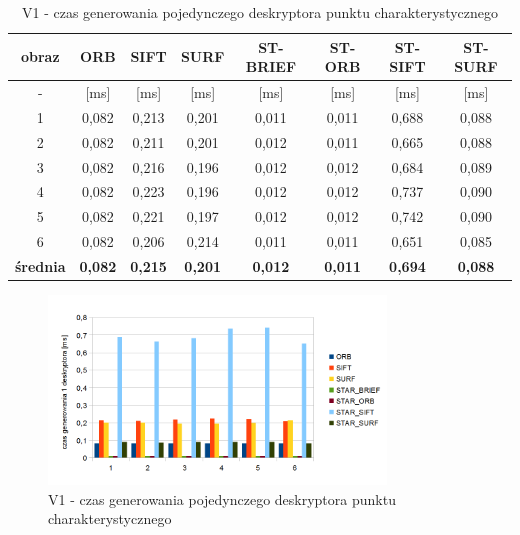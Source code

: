 \begin{table}[htbp]
  \centering
  \caption{V1 - czas generowania pojedynczego deskryptora punktu charakterystycznego}
    \begin{tabular}{|c|c|c|c|c|c|c|c|}\hline

    obraz & \textbf{ORB} & \textbf{SIFT} & \textbf{SURF} & \textbf{ST-BRIEF} & \textbf{ST-ORB} & \textbf{ST-SIFT} & \textbf{ST-SURF} \\\hline

    - & [ms] & [ms] & [ms] & [ms] & [ms] & [ms] & [ms] \\\hline
    1 & 0,082 & 0,213 & 0,201 & 0,011 & 0,011 & 0,688 & 0,088 \\
    2 & 0,082 & 0,211 & 0,201 & 0,012 & 0,011 & 0,665 & 0,088 \\
    3 & 0,082 & 0,216 & 0,196 & 0,012 & 0,012 & 0,684 & 0,089 \\
    4 & 0,082 & 0,223 & 0,196 & 0,012 & 0,012 & 0,737 & 0,090 \\
    5 & 0,082 & 0,221 & 0,197 & 0,012 & 0,012 & 0,742 & 0,090 \\
    6 & 0,082 & 0,206 & 0,214 & 0,011 & 0,011 & 0,651 & 0,085 \\\hline
    \textbf{średnia} & \textbf{0,082} & \textbf{0,215} & \textbf{0,201} & \textbf{0,012} & \textbf{0,011} & \textbf{0,694} & \textbf{0,088} \\\hline
    

    \end{tabular}%
  \label{tab:v1_f3}%
\end{table}%


\begin{figure}
\centering
\includegraphics[width=0.8\textwidth]{pict/slowik/v1/f3.png}
\caption{V1 - czas generowania pojedynczego deskryptora punktu charakterystycznego}
\label{fig:v1_f3}
\end{figure}


